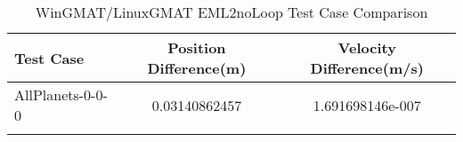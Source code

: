 \begin{table}[htbp!]
\centering
\caption{ WinGMAT/LinuxGMAT EML2noLoop Test Case Comparison}
      \begin{tabular}{lcc}
      \hline\hline
          Test Case & Position Difference(m) & Velocity Difference(m/s) \\
         \hline
         AllPlanets-0-0-0 & 0.03140862457 & 1.691698146e-007 \\
      \hline\hline
      \label{Table: EML2noLoop WinGMAT-LinuxGMAT Table} 
\end{tabular}
\end{table}
